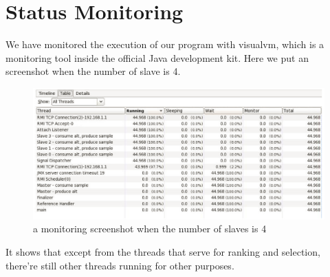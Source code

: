 \chapter{Status Monitoring}

We have monitored the execution of our program with visualvm, which is a monitoring tool inside the official Java development kit. Here we put an screenshot when the number of slave is 4.

\begin{figure}[ht]
\centering
\includegraphics[width=128mm]{monitor.png}
\caption{a monitoring screenshot when the number of slaves is 4}
\end{figure}

It shows that except from the threads that serve for ranking and selection, there're still other threads running for other purposes.

